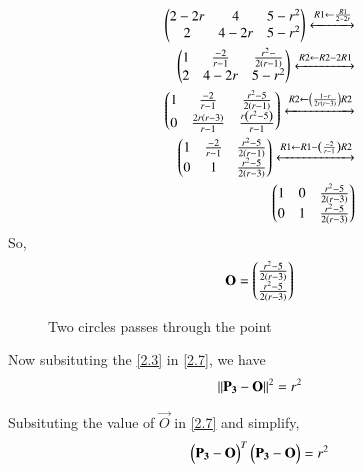 \documentclass[journal,12pt,twocolumn]{IEEEtran}
\begin{document}
	\begin{align}
\myvec{
	2 - 2r & 4 & 5 - r^2 \\
	2 & 4 - 2r & 5 - r^2 \\
}
\xleftrightarrow[]{R1 \leftarrow \frac{R1}{2 - 2r} } \nonumber  \\
%
\myvec{
	1 & \frac{-2}{r-1} & \frac{r^2 - }{2\left( r - 1\right)} \\
	2 & 4 - 2r & 5 - r^2\\
}
\xleftrightarrow[]{R2 \leftarrow  R2 - 2R1 } \nonumber  \\
%
\myvec{
	1 & \frac{-2}{r - 1} & \frac{r^2 - 5}{2 \left( r - 1 \right)} \\
	0 & \frac{2r\left(r - 3 \right) }{ r - 1} & \frac{r \left(r^2 - 5 \right)}{r - 1}
}
\xleftrightarrow[]{R2 \leftarrow \left( \frac{1 - r}{ 2r \left( r - 3\right)}\right)R2 } \nonumber  \\
%	
\myvec{
	1 & \frac{-2}{r - 1} & \frac{r^2 - 5}{2 \left(r - 1\right)} \\
	0 & 1 & \frac{r^2 - 5}{2 \left(r - 3\right)}
}
\xleftrightarrow[]{R1 \leftarrow  R1 - \left( \frac{-2}{r - 1} \right)R2 } \nonumber   \\
\myvec{
	1 & 0 & \frac{r^2 - 5}{2 \left(r - 3\right)} \\
	0 & 1 & \frac{r^2 - 5}{2 \left(r - 3\right)}
}
\end{align}
So,
\begin{align}
\mathbf{O} = \begin{pmatrix} \frac{r^2 - 5}{2 \left(r - 3\right)} \\ \frac{r^2 - 5}{2 \left(r - 3\right)} \\\end{pmatrix} \label{2.19}
\end{align}



\begin{figure}[!htb]
	\centering
	\resizebox{\columnwidth}{!}{}
	\caption{Two circles passes through the point}
\end{figure}


Now subsituting the \ref{2.3} in \ref{2.7}, we have
\begin{align}
\left\lVert  \mathbf{ P_3} - \mathbf{O}\right\rVert^{2} = r^{2} \label{2.20}
\end{align}

Subsituting the value of $\vec{O}$ in \ref{2.7} and simplify,
\begin{align}
\begin{pmatrix}\mathbf{P_3} - \mathbf{O}\end{pmatrix}^T\begin{pmatrix}\mathbf{P_3} - \mathbf{O}\end{pmatrix} = r^2 \label{2.21}
\end{align}
\end{document}
